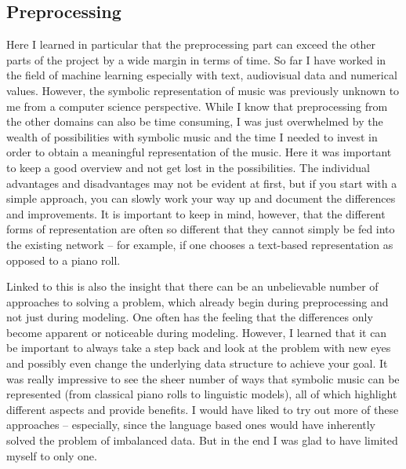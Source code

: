 \documentclass[a4paper, 10pt, xcolor=dvipsnames]{article} %
\begin{document}
\subsection{Preprocessing}
Here I learned in particular that the preprocessing part can
exceed the other parts of the project by a wide margin in terms of time. So far
I have worked in the field of machine learning especially with text,
audiovisual data and numerical values. However, the symbolic representation of
music was previously unknown to me from a computer science perspective. While I
know that preprocessing from the other domains can also be time consuming, I
was just overwhelmed by the wealth of possibilities with symbolic music and the
time I needed to invest in order to obtain a meaningful representation of the
music. Here it was important to keep a good overview and not get lost in the
possibilities. The individual advantages and disadvantages may not be evident
at first, but if you start with a simple approach, you can slowly work your way
up and document the differences and improvements. It is important to keep in
mind, however, that the different forms of representation are often so
different that they cannot simply be fed into the existing network -- for
example, if one chooses a text-based representation as opposed to a piano roll.

Linked to this is also the insight that there can be an unbelievable number of
approaches to solving a problem, which already begin during preprocessing and
not just during modeling. One often has the feeling that the differences only
become apparent or noticeable during modeling. However, I learned that it can
be important to always take a step back and look at the problem with new eyes
and possibly even change the underlying data structure to achieve your goal. It
was really impressive to see the sheer number of ways that symbolic music can
be represented (from classical piano rolls to linguistic models), all of which
highlight different aspects and provide benefits. I would have liked to try out
more of these approaches -- especially, since the language based ones would
have inherently solved the problem of imbalanced data. But in the end I was
glad to have limited myself to only one.
\end{document}
